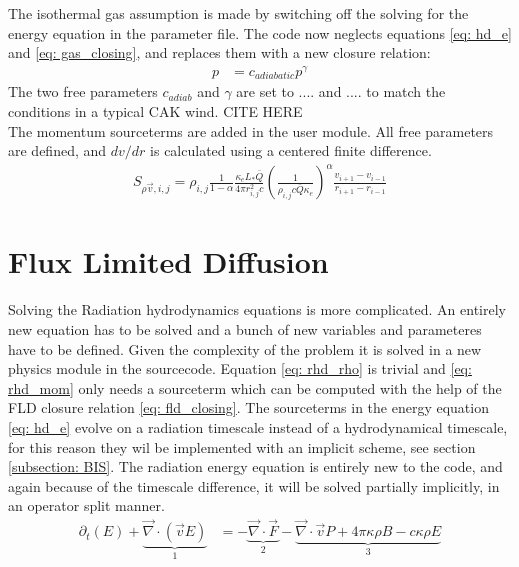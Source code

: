 The isothermal gas assumption is made by switching off the solving for the energy equation in the parameter file. The code now neglects equations \eqref{eq: hd_e} and \eqref{eq: gas_closing}, and replaces them with a new closure relation:
\begin{align}
 p &= c_{adiabatic} p^\gamma
\end{align}
The two free parameters $c_{adiab}$ and $\gamma$ are set to .... and .... to match the conditions in a typical CAK wind. CITE HERE\\

The momentum sourceterms are added in the user module. All free parameters are defined, and $dv/dr$ is calculated using a centered finite difference.
\begin{align}
S_{\rho \vec{v},i,j} = \rho_{i,j} \frac{1}{1-\alpha} \frac{\kappa_e L_* \bar{Q}}{4\pi r_{i,j}^2 c} \left( \frac{1}{\rho_{i,j} c \bar{Q} \kappa_e} \right)^\alpha \frac{v_{i+1} - v_{i-1}}{r_{i+1} - r_{i-1}}
\end{align}


\section{Flux Limited Diffusion}
Solving the Radiation hydrodynamics equations is more complicated. An entirely new equation has to be solved and a bunch of new variables and parameteres have to be defined. Given the complexity of the problem it is solved in a new physics module in the sourcecode. Equation \eqref{eq: rhd_rho} is trivial and \eqref{eq: rhd_mom} only needs a sourceterm which can be computed with the help of the FLD closure relation \eqref{eq: fld_closing}. The sourceterms in the energy equation \eqref{eq: hd_e} evolve on a radiation timescale instead of a hydrodynamical timescale, for this reason they wil be implemented with an implicit scheme, see section \ref{subsection: BIS}. The radiation energy equation is entirely new to the code, and again because of the timescale difference, it will be solved partially implicitly, in an operator split manner. \\

\begin{align}
\partial_t \left(E \right) + \underbrace{\vec{\nabla} \cdot \left( \vec{v} E \right)}_{1}  &= - \underbrace{\vec{\nabla} \cdot \vec{F}}_{2} - \underbrace{\vec{\nabla} \cdot \vec{v} P + 4\pi \kappa\rho B - c \kappa \rho E}_{3} \\
\end{align} 

